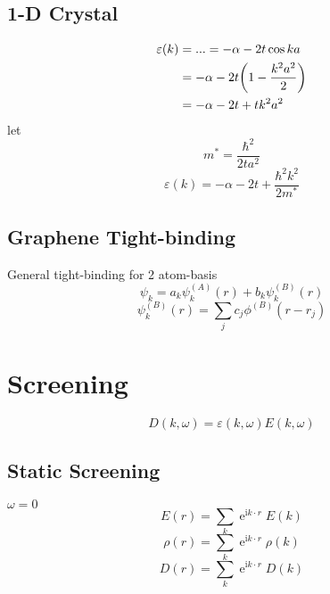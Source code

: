 \documentclass[UTF8]{ctexart} %
\DeclareMathOperator{\e}{\mathrm{e}}
\renewcommand{\I}{\mathrm{i}}
\numberwithin{equation}{section}
\begin{document}
\subsection{1-D Crystal}
\begin{equation}\label{key}
\begin{aligned}
\varepsilon(k) &= ... = -\alpha -2t\cos ka\\
&= -\alpha - 2t\qty(1 - \dfrac{k^2 a^2}{2})\\
&= -\alpha - 2t + t k^2 a^2
\end{aligned}
\end{equation}
let
\begin{equation}\label{key}
m^* = \dfrac{\hbar^2}{2ta^2}
\end{equation}
\begin{equation}\label{key}
\varepsilon(k) = -\alpha - 2t + \dfrac{\hbar^2 k^2}{2m^*}
\end{equation}

\subsection{Graphene Tight-binding}
General tight-binding for 2 atom-basis
\begin{equation}\label{key}
\psi_k = a_k \psi_k^{(A)}(r) + b_k \psi_k^{(B)}(r)
\end{equation}
\begin{equation}\label{key}
\psi_k^{(B)}(r) = \sum_j c_j \phi^{(B)}(r - r_j)
\end{equation}


\section{Screening}
\begin{equation}\label{key}
D(k,\omega) = \varepsilon(k,\omega) E(k,\omega)
\end{equation}
\subsection{Static Screening}
$\omega = 0 $
\begin{equation}\label{key}
E(r) = \sum_k \e^{\I k\cdot r} E(k)
\end{equation}
\begin{equation}\label{key}
\rho(r) = \sum_k \e^{\I k\cdot r} \rho(k)
\end{equation}
\begin{equation}\label{key}
D(r) = \sum_k \e^{\I k\cdot r} D(k)
\end{equation}
\end{document}
